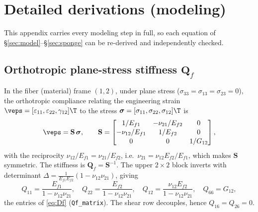 \section{Detailed derivations (modeling)}
\label{app:derivmodel}
This appendix carries every modeling step in full, so each equation of
\S\ref{sec:model}--\S\ref{sec:sponge} can be re-derived and independently checked.

\subsection{Orthotropic plane-stress stiffness $\mathbf Q_f$}
In the fiber (material) frame $(1,2)$, under plane stress
($\sigma_{33}=\sigma_{13}=\sigma_{23}=0$), the orthotropic compliance relating the
engineering strain $\veps=[\varepsilon_{11},\varepsilon_{22},\gamma_{12}]\T$ to the
stress $\bm\sigma=[\sigma_{11},\sigma_{22},\sigma_{12}]\T$ is
\begin{equation}
  \veps=\mathbf S\,\bm\sigma,\qquad
  \mathbf S=\begin{bmatrix} 1/E_{f1} & -\nu_{21}/E_{f2} & 0\\[1pt]
  -\nu_{12}/E_{f1} & 1/E_{f2} & 0\\[1pt] 0 & 0 & 1/G_{12}\end{bmatrix},
\end{equation}
with the reciprocity $\nu_{12}/E_{f1}=\nu_{21}/E_{f2}$, i.e.\
$\nu_{21}=\nu_{12}E_{f2}/E_{f1}$, which makes $\mathbf S$ symmetric. The stiffness
is $\mathbf Q_f=\mathbf S^{-1}$. The upper $2\times2$ block inverts with determinant
$\Delta=\tfrac{1}{E_{f1}E_{f2}}(1-\nu_{12}\nu_{21})$, giving
\begin{equation}
  Q_{11}=\frac{E_{f1}}{1-\nu_{12}\nu_{21}},\quad
  Q_{22}=\frac{E_{f2}}{1-\nu_{12}\nu_{21}},\quad
  Q_{12}=\frac{\nu_{12}E_{f2}}{1-\nu_{12}\nu_{21}},\quad Q_{66}=G_{12},
\end{equation}
the entries of \eqref{eq:Df} (\texttt{Qf\_matrix}). The shear row decouples, hence
$Q_{16}=Q_{26}=0$.

